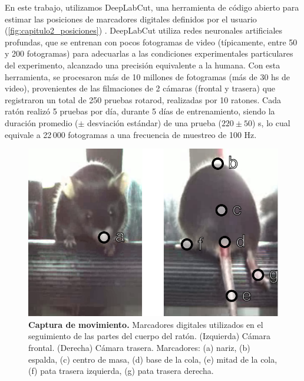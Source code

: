 En este trabajo, utilizamos DeepLabCut, una herramienta de código abierto para estimar las posiciones de marcadores digitales definidos por el usuario (\autoref{fig:capitulo2_posiciones}) \cite{mathis_deeplabcut}. DeepLabCut utiliza redes neuronales artificiales profundas, que se entrenan con pocos fotogramas de video (típicamente, entre 50 y 200 fotogramas) para adecuarlas a las condiciones experimentales particulares del experimento, alcanzado una precisión equivalente a la humana. Con esta herramienta, se procesaron más de 10 millones de fotogramas (más de 30 hs de video), provenientes de las filmaciones de 2 cámaras (frontal y trasera) que registraron un total de 250 pruebas rotarod, realizadas por 10 ratones. Cada ratón realizó 5 pruebas por día, durante 5 días de entrenamiento, siendo la duración promedio ($\pm$ desviación estándar) de una prueba ($220 \pm 50$) s, lo cual equivale a 22\,000 fotogramas a una frecuencia de muestreo de 100 Hz.

\begin{figure}[htbp]
    \centering
    \includegraphics[width=0.65\linewidth]{figuras/capitulo2/captura_movimiento.pdf}
    \caption{\textbf{Captura de movimiento.} Marcadores digitales utilizados en el seguimiento de las partes del cuerpo del ratón.
        (Izquierda) Cámara frontal. (Derecha) Cámara trasera.
        Marcadores: (a) nariz, (b) espalda, (c) centro de masa, (d) base de la cola, (e) mitad de la cola, (f) pata trasera izquierda, (g) pata trasera derecha.}
    \label{fig:capitulo2_captura_movimiento}
\end{figure}

